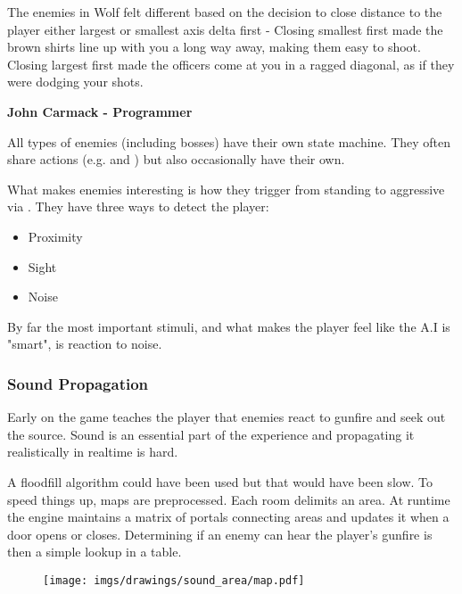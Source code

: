 \begin{fancyquotes}
The enemies in Wolf felt different based on the decision to close distance to the player either largest or smallest axis delta first - Closing smallest first made the brown shirts line up with you a long way away, making them easy to shoot.  Closing largest first made the officers come at you in a ragged diagonal, as if they were dodging your shots.\\
\par
\textbf{John Carmack - Programmer}
 \end{fancyquotes}
\par
All types of enemies (including bosses) have their own state machine. They often share actions (e.g.  and ) but also occasionally have their own.\\
\par
What makes enemies interesting is how they trigger from standing to aggressive via . They have three ways to detect the player:
\begin{itemize}
\item Proximity
\item Sight
\item Noise
\end{itemize}
By far the most important stimuli, and what makes the player feel like the A.I is "smart", is reaction to noise.





\subsubsection{Sound Propagation}
Early on the game teaches the player that enemies react to gunfire and seek out the source. Sound is an essential part of the experience and propagating it realistically in realtime is hard.\\
\par
 A floodfill algorithm could have been used but that would have been slow. To speed things up, maps are preprocessed. Each room delimits an area. At runtime the engine maintains a matrix of portals connecting areas and updates it when a door opens or closes. Determining if an enemy can hear the player's gunfire is then a simple lookup in a table.

\par
\begin{figure}[H]
 \centering
 \texttt{[image: imgs/drawings/sound\_area/map.pdf]}
 
\end{figure}

